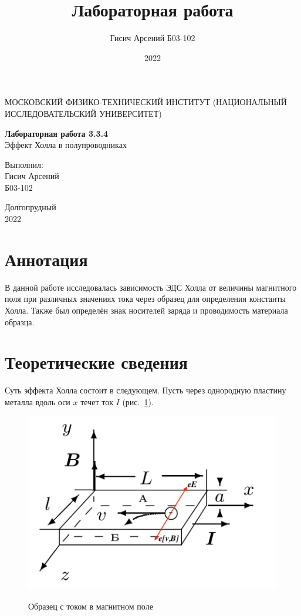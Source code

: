 \documentclass[a4paper, 12pt]{article}
\title{Лабораторная работа}
\author{Гисич Арсений Б03-102}
\date{2022}
\begin{document}
	\begin{center}
		{\large МОСКОВСКИЙ ФИЗИКО-ТЕХНИЧЕСКИЙ ИНСТИТУТ (НАЦИОНАЛЬНЫЙ ИССЛЕДОВАТЕЛЬСКИЙ УНИВЕРСИТЕТ)}
	\end{center}
	\vspace{5 cm}
	{\Large
		\begin{center}
			{\bf Лабораторная работа 3.3.4}\\[0.2 cm]
			Эффект Холла в полупроводниках
		\end{center}
	}
	\vspace{4 cm}
	\begin{flushright}
		{\Large Выполнил: \\
			\vspace{0.2 cm}
			Гисич Арсений \\
			\vspace{0.2 cm}
			Б03-102 \\}
	\end{flushright}
	\vspace{9 cm}
	\begin{center}
		Долгопрудный\\[0.1 cm]
		2022
	\end{center}
\thispagestyle{empty}

\section{Аннотация}

В данной работе исследовалась зависимость ЭДС Холла от величины магнитного поля при различных значениях тока через образец для определения константы Холла. Также был определён знак носителей заряда и проводимость материала образца.

\section{Теоретические сведения}

Суть эффекта Холла состоит в следующем. Пусть через однородную пластину металла вдоль оси $x$ течет ток $I$ (рис.~\ref{ris1}).
	
\begin{figure}
	\vspace{-20pt}
	\begin{center}
		\includegraphics[width=0.7\linewidth]{1.png}
		\label{ris1}
	\end{center}
	\vspace{-20pt}
	\caption{Образец с током в магнитном поле}
\end{figure}
\end{document}
